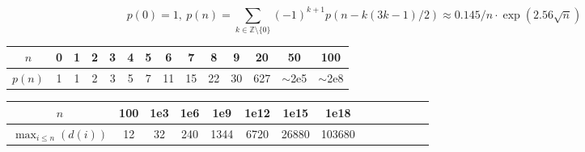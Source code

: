 \vspace{-0.5em}
\[
p(0) = 1,\ p(n) = \sum_{k \in \mathbb Z \setminus \{0\}}{(-1)^{k+1} p(n - k(3k-1) / 2)}
  \approx 0.145 / n \cdot \exp(2.56 \sqrt{n})
\]

\begin{center}
\begin{tabular}{c|c@{\ }c@{\ }c@{\ }c@{\ }c@{\ }c@{\ }c@{\ }c@{\ }c@{\ }c@{\ }c@{\ }c@{\ }c}
        $n$    & 0 & 1 & 2 & 3 & 4 & 5 & 6  & 7  & 8  & 9  & 20  & 50  & 100 \\ \hline
        $p(n)$ & 1 & 1 & 2 & 3 & 5 & 7 & 11 & 15 & 22 & 30 & 627 & $\mathtt{\sim}$2e5 & $\mathtt{\sim}$2e8 \\
\end{tabular}
\end{center}

\vspace{-1.5em}
\begin{center}
\begin{tabular}{c|c@{\ }c@{\ }c@{\ }c@{\ }c@{\ }c@{\ }c@{\ }c@{\ }c@{\ }c@{\ }c@{\ }c@{\ }c}
        $n$                      & 100 & 1e3 & 1e6 & 1e9  & 1e12 & 1e15  & 1e18 \\ \hline
        $\max _ {i\leq n}(d(i))$ & 12  & 32  & 240 & 1344 & 6720 & 26880 & 103680 \\
\end{tabular}
\end{center}



